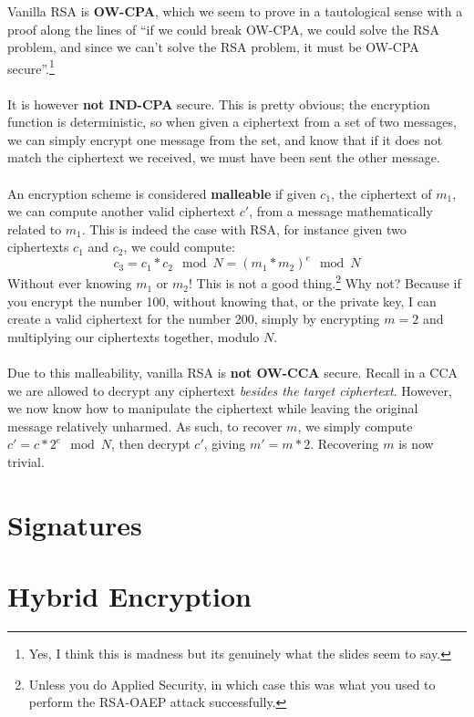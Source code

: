 		Vanilla RSA is \textbf{OW-CPA}, which we seem to prove in a tautological sense with a proof along the lines of ``if we could break OW-CPA, we could solve the RSA problem, and since we can't solve the RSA problem, it must be OW-CPA secure''.\footnote{Yes, I think this is madness but its genuinely what the slides seem to say.}\\
		\\
		It is however \textbf{not IND-CPA} secure. This is pretty obvious; the encryption function is deterministic, so when given a ciphertext from a set of two messages, we can simply encrypt one message from the set, and know that if it does not match the ciphertext we received, we must have been sent the other message.\\
		\\
		An encryption scheme is considered \textbf{malleable} if given $c_1$, the ciphertext of $m_1$, we can compute another valid ciphertext $c'$, from a message mathematically related to $m_1$. This is indeed the case with RSA, for instance given two ciphertexts $c_1$ and $c_2$, we could compute:
		$$c_3 = c_1*c_2 \mod N = (m_1 * m_2)^e \mod N$$ 
		Without ever knowing $m_1$ or $m_2$! This is not a good thing.\footnote{Unless you do Applied Security, in which case this was what you used to perform the RSA-OAEP attack successfully.} Why not? Because if you encrypt the number 100, without knowing that, or the private key, I can create a valid ciphertext for the number 200, simply by encrypting $m = 2$ and multiplying our ciphertexts together, modulo $N$.\\
		\\
		Due to this malleability, vanilla RSA is \textbf{not OW-CCA} secure. Recall in a CCA we are allowed to decrypt any ciphertext \textit{besides the target ciphertext}. However, we now know how to manipulate the ciphertext while leaving the original message relatively unharmed. As such, to recover $m$, we simply compute $c' = c*2^e \mod N$, then decrypt $c'$, giving $m' = m * 2$. Recovering $m$ is now trivial.


\section{Signatures}



\section{Hybrid Encryption}

